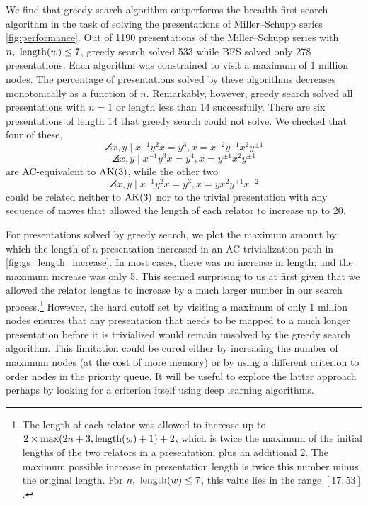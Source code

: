 We find that greedy-search algorithm outperforms the breadth-first search algorithm in the task of solving the presentations of Miller--Schupp series \autoref{fig:performance}.
Out of 1190 presentations of the Miller--Schupp series with $n, \ \operatorname{length}(w) \leq 7$, greedy search solved 533 while BFS solved only 278 presentations.
Each algorithm was constrained to visit a maximum of 1 million nodes.
The percentage of presentations solved by these algorithms decreases monotonically as a function of $n$.
Remarkably, however, greedy search solved all presentations with $n=1$ or length less than 14 successfully.
There are six presentations of length 14 that greedy search could not solve.
We checked that four of these,
\[
\angles{x, y \mid x^{-1} y^2 x = y^{3} , x = x^{-2} y^{-1} x^2 y^{\pm 1}}
\]
\[
\angles{x, y \mid x^{-1} y^3 x = y^{4} , x = y^{\pm 1} x^2 y^{\pm 1}}
\]
are AC-equivalent to $\text{AK}(3)$, while the other two
\[
\angles{x, y \mid x^{-1} y^2 x = y^{3} , x = y x^2 y^{\pm 1} x^{-2}}
\]
could be related neither to $\text{AK}(3)$ nor to the trivial presentation with any sequence of moves that allowed the length of each relator to increase up to 20.

For presentations solved by greedy search, we plot the maximum amount by which the length of a presentation increased in an AC trivialization path in \autoref{fig:gs_length_increase}.
In most cases, there was no increase in length; and the maximum increase was only 5.
This seemed surprising to us at first given that we allowed the relator lengths to increase by a much larger number in our search process.\footnote{
The length of each relator was allowed to increase up to \(2 \times \text{max}(2n+3, \operatorname{length}(w)+1) + 2\), which is twice the maximum of the initial lengths of the two relators in a presentation, plus an additional 2.
The maximum possible increase in presentation length is twice this number minus the original length.
For $n, \ \operatorname{length}(w) \leq 7$, this value lies in the range $[17, 53]$.}
However, the hard cutoff set by visiting a maximum of only 1 million nodes ensures that any presentation that needs to be mapped to a much longer presentation before it is trivialized would remain unsolved by the greedy search algorithm.
This limitation could be cured either by increasing the number of maximum nodes (at the cost of more memory) or by using a different criterion to order nodes in the priority queue.
It will be useful to explore the latter approach perhaps by looking for a criterion itself using deep learning algorithms.

